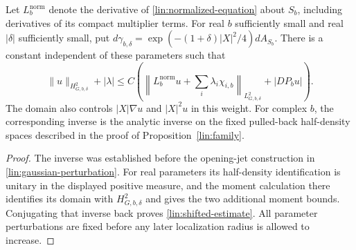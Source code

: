 \begin{corollary}\label{lin:shifted-gaussian}
Let $L_b^{\mathrm{norm}}$ denote the derivative of
\eqref{lin:normalized-equation} about $S_b$, including derivatives of
its compact multiplier terms.  For real $b$ sufficiently small and
real $|\delta|$ sufficiently small, put
$d\gamma_{b,\delta}=\exp(-(1+\delta)|X|^2/4)dA_{S_b}$.
There is a constant independent of these parameters such that
\begin{equation}\label{lin:shifted-estimate}
 \|u\|_{H^2_{G,b,\delta}}+|\lambda|
 \le C\left(
  \left\|L_b^{\mathrm{norm}}u+\sum_i\lambda_i\chi_{i,b}
        \right\|_{L^2_{G,b,\delta}}+|D P_bu|\right).
\end{equation}
The domain also controls $|X|\nabla u$ and $|X|^2u$ in this weight.
For complex $b$, the corresponding inverse is the analytic inverse
on the fixed pulled-back half-density spaces described in the proof
of Proposition~\ref{lin:family}.
\end{corollary}

\begin{proof}
The inverse was established before the opening-jet construction in
\eqref{lin:gaussian-perturbation}.  For real parameters its half-density
identification is unitary in the displayed positive measure, and the
moment calculation there identifies its domain with
$H^2_{G,b,\delta}$ and gives the two additional moment bounds.
Conjugating that inverse back proves \eqref{lin:shifted-estimate}.
All parameter perturbations are fixed before any later localization
radius is allowed to increase.
\end{proof}
